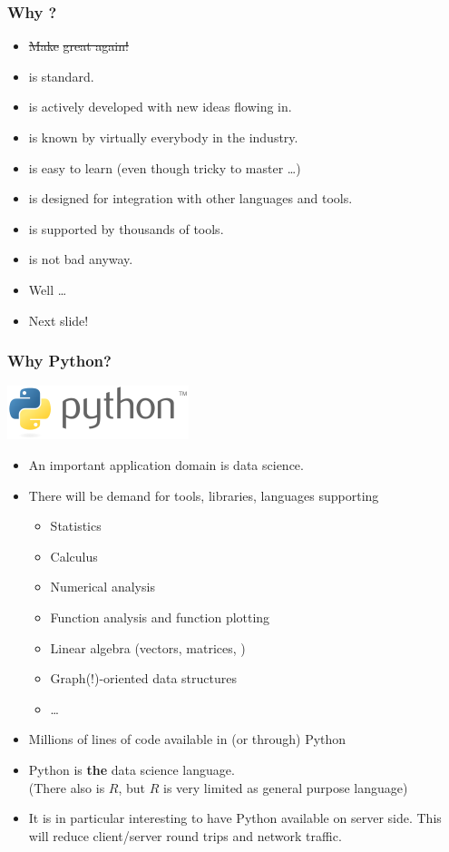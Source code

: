 \documentclass[mathserif,usenames,dvipsnames]{beamer}
\begin{document}
\begin{frame}
\frametitle{Why ?}
\begin{itemize}
\item \st{Make }\st{ great again!}
\item {} is standard.
\item {} is actively developed with new ideas flowing in.
\item {} is known by virtually everybody in the industry.
\item {} is easy to learn (even though tricky to master \dots)
\item {} is designed for integration with other languages and tools.
\item {} is supported by thousands of tools.
\item {} is not bad anyway.
\item Well \dots
\item Next slide!
\end{itemize}
\end{frame}

\begin{frame}[shrink]
\frametitle{Why Python?}
\includegraphics[width=0.2\linewidth]{../img/pythonlogo.png}
\begin{itemize}
\item An important application domain is data science.
\item There will be demand for tools, libraries, languages supporting
\begin{itemize}
\item Statistics
\item Calculus
\item Numerical analysis
\item Function analysis and function plotting
\item Linear algebra (vectors, matrices, \etc)
\item Graph(!)-oriented data structures
\item \dots
\end{itemize}
\item Millions of lines of code available in (or through) Python
\item Python is \textbf{the} data science language.\\
      (There also is $R$, but $R$ is very limited as general purpose language)
\item It is in particular interesting to have Python available
      on server side.
      This will reduce client/server round trips
      and network traffic.
\end{itemize}
\end{frame}
\end{document}
